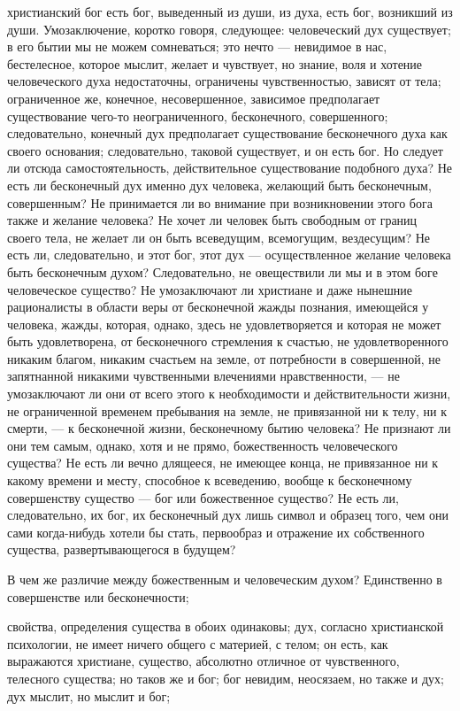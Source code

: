 \documentclass[12pt]{article}
\begin{document}
христианский бог есть бог, выведенный из души, из духа, есть бог, возникший из души. Умозаключение, коротко говоря, следующее: человеческий дух существует; в его бытии мы не можем сомневаться; это нечто --- невидимое в нас, бестелесное, которое мыслит, желает и чувствует, но знание, воля и хотение человеческого духа недостаточны, ограничены чувственностью, зависят от тела; ограниченное же, конечное, несовершенное, зависимое предполагает существование чего-то неограниченного, бесконечного, совершенного; следовательно, конечный дух предполагает существование бесконечного духа как своего основания; следовательно, таковой существует, и он есть бог. Но следует ли отсюда самостоятельность, действительное существование подобного духа? Не есть ли бесконечный дух именно дух человека, желающий быть бесконечным, совершенным? Не принимается ли во внимание при возникновении этого бога также и желание человека? Не хочет ли человек быть свободным от границ своего тела, не желает ли он быть всеведущим, всемогущим, вездесущим? Не есть ли, следовательно, и этот бог, этот дух --- осуществленное желание человека быть бесконечным духом? Следовательно, не овеществили ли мы и в этом боге человеческое существо? Не умозаключают ли христиане и даже нынешние рационалисты в области веры от бесконечной жажды познания, имеющейся у человека, жажды, которая, однако, здесь не удовлетворяется и которая не может быть удовлетворена, от бесконечного стремления к счастью, не удовлетворенного никаким благом, никаким счастьем на земле, от потребности в совершенной, не запятнанной никакими чувственными влечениями нравственности, --- не умозаключают ли они от всего этого к необходимости и действительности жизни, не ограниченной временем пребывания на земле, не привязанной ни к телу, ни к смерти, --- к бесконечной жизни, бесконечному бытию человека? Не признают ли они тем самым, однако, хотя и не прямо, божественность человеческого существа? Не есть ли вечно длящееся, не имеющее конца, не привязанное ни к какому времени и месту, способное к всеведению, вообще к бесконечному совершенству существо --- бог или божественное существо? Не есть ли, следовательно, их бог, их бесконечный дух лишь символ и образец того, чем они сами когда-нибудь хотели бы стать, первообраз и отражение их собственного существа, развертывающегося в будущем? 

В чем же различие между божественным и человеческим духом? Единственно в совершенстве или бесконечности; 

свойства, определения существа в обоих одинаковы; дух, согласно христианской психологии, не имеет ничего общего с материей, с телом; он есть, как выражаются христиане, существо, абсолютно отличное от чувственного, телесного существа; но таков же и бог; бог невидим, неосязаем, но также и дух; дух мыслит, но мыслит и бог; 
\end{document}

